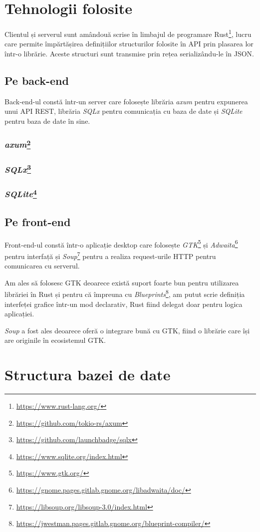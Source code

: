 \documentclass{article}
\begin{document}
    \section{Tehnologii folosite}

    Clientul și serverul sunt amândouă scrise în limbajul de programare Rust\footnote{\url{https://www.rust-lang.org/}},
    lucru care permite împărtășirea definițiilor structurilor folosite în API prin plasarea lor într-o librărie.
    Aceste structuri sunt transmise prin rețea serializându-le în JSON.

    \subsection{Pe back-end}

    Back-end-ul constă într-un server care folosește librăria \emph{axum} pentru expunerea unui API REST,
    librăria \emph{SQLx} pentru comunicația cu baza de date și \emph{SQLite} pentru baza de date în sine.

    \subsubsection*{\emph{axum}\footnote{\url{https://github.com/tokio-rs/axum}}}

    \subsubsection*{\emph{SQLx}\footnote{\url{https://github.com/launchbadge/sqlx}}}

    \subsubsection*{\emph{SQLite}\footnote{\url{https://www.sqlite.org/index.html}}}

    \subsection{Pe front-end}

    Front-end-ul constă într-o aplicație desktop care folosește \emph{GTK}\footnote{\url{https://www.gtk.org/}}
    și \emph{Adwaita}\footnote{\url{https://gnome.pages.gitlab.gnome.org/libadwaita/doc/}} pentru interfață și
    \emph{Soup}\footnote{\url{https://libsoup.org/libsoup-3.0/index.html}} pentru a realiza request-urile HTTP
    pentru comunicarea cu serverul.

    Am ales să folosesc GTK deoarece există suport foarte bun pentru utilizarea librăriei în Rust și pentru
    că împreuna cu \emph{Blueprints}\footnote{\url{https://jwestman.pages.gitlab.gnome.org/blueprint-compiler/}},
    am putut scrie definiția interfeței grafice într-un mod declarativ, Rust fiind delegat doar pentru logica
    aplicației.

    \emph{Soup} a fost ales deoarece oferă o integrare bună cu GTK, fiind o librărie care își are originile
    în ecosistemul GTK.

    \section{Structura bazei de date}
\end{document}
